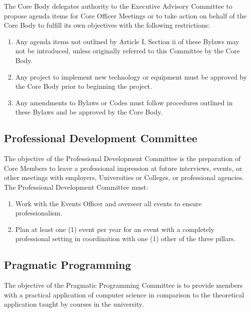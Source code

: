 \documentclass{article}
\newenvironment{li}{
\begin{enumerate}
  \setlength{\itemsep}{1pt}
  \setlength{\parskip}{0pt}
  \setlength{\parsep}{0pt}
}{\end{enumerate}}
\begin{document}
\noindent The Core Body delegates authority to the Executive Advisory Committee to propose agenda items for Core Officer Meetings or to take action on behalf of the Core Body to fulfill its own objectives with the following restrictions:
\begin{li}
\item Any agenda items not outlined by Article I, Section ii of these Bylaws may not be introduced, unless originally referred to this Committee by the Core Body.
\item Any project to implement new technology or equipment must be approved by the Core Body prior to beginning the project.
\item Any amendments to Bylaws or Codes must follow procedures outlined in these Bylaws and be approved by the Core Body.
\end{li}

 \subsection{Professional Development Committee}
 The objective of the Professional Development Committee is the preparation of Core Members to leave a professional impression at future interviews, events, or other meetings with employers, Universities or Colleges, or professional agencies. The Professional Development Committee must:
 \begin{li}
 \item Work with the Events Officer and overseer all events to ensure professionalism.
 \item Plan at least one (1) event per year for an event with a completely professional setting in coordination with one (1) other of the three pillars.
 \end{li}
 
 \subsection{Pragmatic Programming}
 The objective of the Pragmatic Programming Committee is to provide members with a practical application of computer science in comparison to the theoretical application taught by courses in the university.


\end{document}
